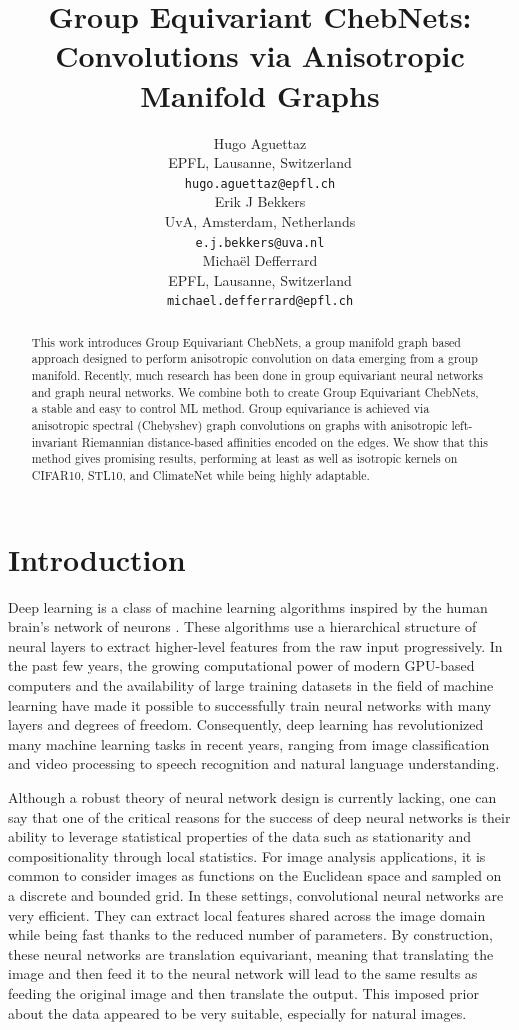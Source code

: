 \documentclass{article}
\title{Group Equivariant ChebNets: Convolutions via Anisotropic Manifold Graphs}
\author{%
  Hugo Aguettaz \\
  EPFL, Lausanne, Switzerland \\
  \texttt{hugo.aguettaz@epfl.ch} \\
  \And
  Erik J Bekkers \\
  UvA, Amsterdam, Netherlands \\
  \texttt{e.j.bekkers@uva.nl} \\
  \AND
  Michaël Defferrard \\
  EPFL, Lausanne, Switzerland \\
  \texttt{michael.defferrard@epfl.ch} \\
}
\begin{document}
\maketitle

\begin{abstract}
    This work introduces Group Equivariant ChebNets, a group manifold graph based approach designed to perform anisotropic convolution on data emerging from a group manifold. Recently, much research has been done in group equivariant neural networks and graph neural networks. We combine both to create Group Equivariant ChebNets, a stable and easy to control ML method.  Group equivariance is achieved via anisotropic spectral (Chebyshev) graph convolutions on graphs with anisotropic left-invariant Riemannian distance-based affinities encoded on the edges. We show that this method gives promising results, performing at least as well as isotropic kernels on CIFAR10, STL10, and ClimateNet while being highly adaptable.
\end{abstract}

\section{Introduction} \label{sec:introduction}

Deep learning is a class of machine learning algorithms inspired by the human brain's network of neurons \citep{goodfellow2016deep}. These algorithms use a hierarchical structure of neural layers to extract higher-level features from the raw input progressively. In the past few years, the growing computational power of modern GPU-based computers and the availability of large training datasets in the field of machine learning have made it possible to successfully train neural networks with many layers and degrees of freedom. Consequently, deep learning has revolutionized many machine learning tasks in recent years, ranging from image classification and video processing to speech recognition and natural language understanding.

Although a robust theory of neural network design is currently lacking, one can say that one of the critical reasons for the success of deep neural networks is their ability to leverage statistical properties of the data such as stationarity and compositionality through local statistics. For image analysis applications, it is common to consider images as functions on the Euclidean space and sampled on a discrete and bounded grid. In these settings, convolutional neural networks are very efficient. They can extract local features shared across the image domain while being fast thanks to the reduced number of parameters. By construction, these neural networks are translation equivariant, meaning that translating the image and then feed it to the neural network will lead to the same results as feeding the original image and then translate the output. This imposed prior about the data appeared to be very suitable, especially for natural images.
\end{document}
